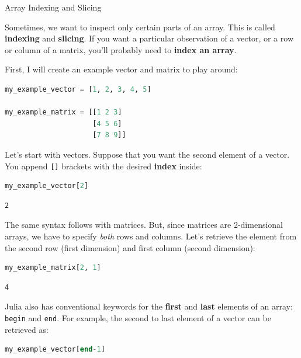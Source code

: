 \documentclass[
  notoc %
]{tufte-book}
\makeatletter
\newcommand{\passthrough}[1]{#1}
\renewcommand\subsubsection{%
\@startsection{subsubsection}{3}{\z@ }{-3.25ex\@plus -1ex \@minus -.2ex}{1.5ex \@plus .2ex}{\normalfont \normalsize \bfseries }
}
\makeatother
\begin{document}
\hypertarget{sec:array_indexing}{%
\subsubsection{Array Indexing and Slicing}\label{sec:array_indexing}}

Sometimes, we want to inspect only certain parts of an array. This is
called \textbf{indexing} and \textbf{slicing}. If you want a particular
observation of a vector, or a row or column of a matrix, you'll probably
need to \textbf{index an array}.

First, I will create an example vector and matrix to play around:

\begin{lstlisting}[language=Julia]
my_example_vector = [1, 2, 3, 4, 5]

my_example_matrix = [[1 2 3]
                     [4 5 6]
                     [7 8 9]]
\end{lstlisting}

Let's start with vectors. Suppose that you want the second element of a
vector. You append \passthrough{\lstinline![]!} brackets with the
desired \textbf{index} inside:

\begin{lstlisting}[language=Julia]
my_example_vector[2]
\end{lstlisting}

\begin{lstlisting}[language=Output]
2
\end{lstlisting}

The same syntax follows with matrices. But, since matrices are
2-dimensional arrays, we have to specify \emph{both} rows and columns.
Let's retrieve the element from the second row (first dimension) and
first column (second dimension):

\begin{lstlisting}[language=Julia]
my_example_matrix[2, 1]
\end{lstlisting}

\begin{lstlisting}[language=Output]
4
\end{lstlisting}

Julia also has conventional keywords for the \textbf{first} and
\textbf{last} elements of an array: \passthrough{\lstinline!begin!} and
\passthrough{\lstinline!end!}. For example, the second to last element
of a vector can be retrieved as:

\begin{lstlisting}[language=Julia]
my_example_vector[end-1]
\end{lstlisting}
\end{document}
